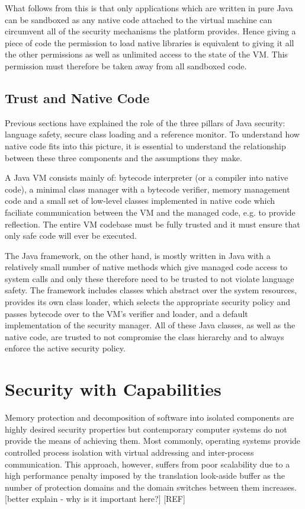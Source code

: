 \documentclass[a4paper,12pt,twoside,openright]{report}
\begin{document}
What follows from this is that only applications which are written in pure Java can be sandboxed as any native code attached to the virtual machine can circumvent all of the security mechanisms the platform provides. Hence giving a piece of code the permission to load native libraries is equivalent to giving it all the other permissions as well as unlimited access to the state of the VM. This permission must therefore be taken away from all sandboxed code.

\subsection{Trust and Native Code}

Previous sections have explained the role of the three pillars of Java security: language safety, secure class loading and a reference monitor. To understand how native code fits into this picture, it is essential to understand the relationship between these three components and the assumptions they make.

A Java VM consists mainly of: bytecode interpreter (or a compiler into native code), a minimal class manager with a bytecode verifier, memory management code and a small set of low-level classes implemented in native code which faciliate communication between the VM and the managed code, e.g. to provide reflection. The entire VM codebase must be fully trusted and it must ensure that only safe code will ever be executed.

The Java framework, on the other hand, is mostly written in Java with a relatively small number of native methods which give managed code access to system calls and only these therefore need to be trusted to not violate language safety. The framework includes classes which abstract over the system resources, provides its own class loader, which selects the appropriate security policy and passes bytecode over to the VM's verifier and loader, and a default implementation of the security manager. All of these Java classes, as well as the native code, are trusted to not compromise the class hierarchy and to always enforce the active security policy.

\section{Security with Capabilities}

Memory protection and decomposition of software into isolated components are highly desired security properties but contemporary computer systems do not provide the means of achieving them. Most commonly, operating systems provide controlled process isolation with virtual addressing and inter-process communication. This approach, however, suffers from poor scalability due to a high performance penalty imposed by the translation look-aside buffer as the number of protection domains and the domain switches between them increases. [better explain - why is it important here?] [REF] 
\end{document}

